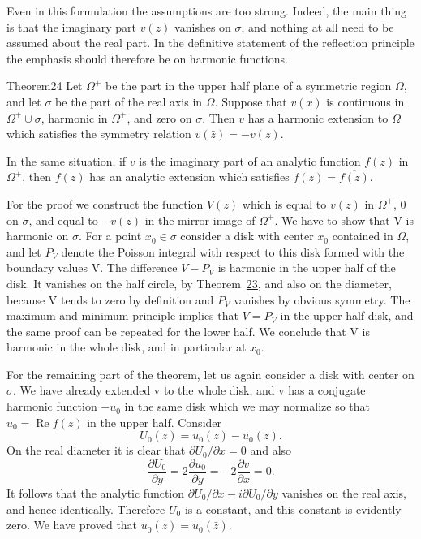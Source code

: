 Even in this formulation the assumptions are too strong. Indeed, the main thing is that the imaginary part $v(z)$ vanishes on $\sigma$, and nothing at all need to be assumed about the real part. In the definitive statement of the reflection principle the emphasis should therefore be on harmonic functions.

\begin{originalstatement}{Theorem}{24}\label{thm:4.24}
Let $\Omega^{+}$ be the part in the upper half plane of a symmetric region $\Omega$, and let $\sigma$ be the part of the real axis in $\Omega$. Suppose that $v(x)$ is continuous in $\Omega^{+} \cup \sigma$, harmonic in $\Omega^{+}$, and zero on $\sigma$. Then $v$ has a harmonic extension to $\Omega$ which satisfies the symmetry relation $v(\bar{z}) = -v(z)$.
\par
In the same situation, if $v$ is the imaginary part of an analytic function $f(z)$ in $\Omega^{+}$, then $f(z)$ has an analytic extension which satisfies $f(z) = \overline{f(\overline{z})}$.
\end{originalstatement}

For the proof we construct the function $V(z)$ which is equal to $v(z)$ in $\Omega^{+}$, 0 on $\sigma$, and equal to $-v(\bar{z})$ in the mirror image of $\Omega^{+}$. We have to show that V is harmonic on $\sigma$. For a point $x_{0} \in \sigma$ consider a disk with center $x_{0}$ contained in $\Omega$, and let $P_{V}$ denote the Poisson integral with respect to this disk formed with the boundary values V. The difference $V - P_{V}$ is harmonic in the upper half of the disk. It vanishes on the half circle, by Theorem~\hyperref[thm:4.23]{23}, and also on the diameter, because V tends to zero by definition and $P_{V}$ vanishes by obvious symmetry. The maximum and minimum principle implies that $V = P_{V}$ in the upper half disk, and the same proof can be repeated for the lower half. We conclude that V is harmonic in the whole disk, and in particular at $x_{0}$.

For the remaining part of the theorem, let us again consider a disk with center on $\sigma$. We have already extended v to the whole disk, and v has a conjugate harmonic function $-u_{0}$ in the same disk which we may normalize so that $u_{0} = \operatorname{Re} f(z)$ in the upper half. Consider
\begin{equation*}
U _ {0} (z) = u _ {0} (z) - u _ {0} (\bar {z}).
\end{equation*}
On the real diameter it is clear that $\partial U_0 / \partial x = 0$ and also
\begin{equation*}
\frac {\partial U _ {0}}{\partial y} = 2 \frac {\partial u _ {0}}{\partial y} = - 2 \frac {\partial v}{\partial x} = 0.
\end{equation*}
It follows that the analytic function $\partial U_{0}/\partial x - i \partial U_{0}/\partial y$ vanishes on the real axis, and hence identically. Therefore $U_{0}$ is a constant, and this constant is evidently zero. We have proved that $u_{0}(z) = u_{0}(\bar{z})$.

